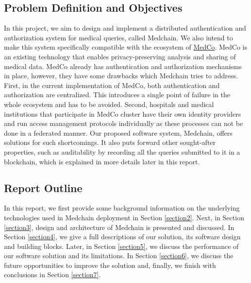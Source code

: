 \subsection{Problem Definition and Objectives}

In this project, we aim to design and implement a distributed authentication and authorization system for medical queries, called Medchain. We also intend to make this system specifically compatible with the ecosystem of \href{https://medco.epfl.ch/}{MedCo}. MedCo is an existing technology that enables privacy-preserving analysis and sharing of medical data. MedCo already has authentication and authorization mechanisms in place, however, they have some drawbacks which Medchain tries to address. First, in the current implementation of MedCo, both authentication and authorization are centralized. This introduces a single point of failure in the whole ecosystem and has to be avoided. Second, hospitals and medical institutions that participate in MedCo cluster have their own identity providers and run access management protocols individually as these processes can not be done in a federated manner. Our proposed software system, Medchain, offers solutions for such shortcomings. It also puts forward other sought-after properties, such as auditability by recording all the queries submitted to it in a blockchain, which is explained in more details later in this report. 


\subsection{Report Outline}
In this report, we first provide some background information on the underlying technologies used in Medchain deployment in Section \ref{section2}. Next, in Section \ref{section3}, design and architecture of Medchain is presented and discussed. In Section \ref{section4}, we give a full descriptions of our solution, its software design and building blocks. Later, in Section \ref{section5}, we discuss the performance of our software solution and its limitations. In Section \ref{section6}, we discuss the future opportunities to improve the solution and, finally, we finish with conclusions in Section \ref{section7}.